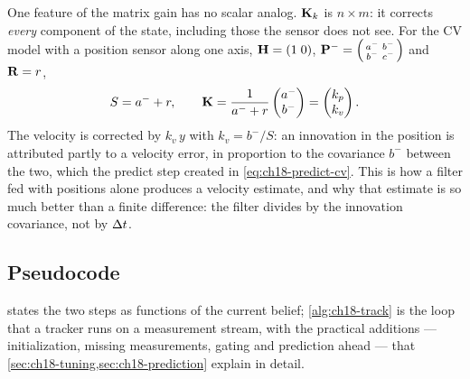 One feature of the matrix gain has no scalar analog. $\mathbf{K}_k$ is
$n\times m$: it corrects \emph{every} component of the state, including
those the sensor does not see. For the CV model with a position sensor along
one axis, $\mathbf{H}=(1\;0)$, $\mathbf{P}^-=\begin{psmallmatrix}a^-&b^-\\
b^-&c^-\end{psmallmatrix}$ and $\mathbf{R}=r$,
\begin{equation}
  S=a^-+r,\qquad
  \mathbf{K}=\frac1{a^-+r}\begin{pmatrix}a^-\\ b^-\end{pmatrix}
  =\begin{pmatrix}k_p\\ k_v\end{pmatrix}.
  \label{eq:ch18-gain-cv}
\end{equation}
The velocity is corrected by $k_v\,y$ with $k_v=b^-/S$: an innovation in the
position is attributed partly to a velocity error, in proportion to the
covariance $b^-$ between the two, which the predict step created in
\cref{eq:ch18-predict-cv}. This is how a filter fed with positions alone
produces a velocity estimate, and why that estimate is so much better than a
finite difference: the filter divides by the innovation covariance, not by
$\Delta t$.

\subsection{Pseudocode}
\label{sec:ch18-pseudocode}

 states the two steps as functions of the current belief;
\cref{alg:ch18-track} is the loop that a tracker runs on a measurement stream,
with the practical additions --- initialization, missing measurements, gating
and prediction ahead --- that \cref{sec:ch18-tuning,sec:ch18-prediction}
explain in detail.

